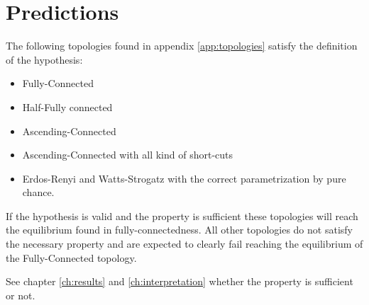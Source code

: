 \documentclass[Bachelorarbeit.tex]{subfiles}
\begin{document}
\section{Predictions}
The following topologies found in appendix \ref{app:topologies} satisfy the definition of the hypothesis:

\begin{itemize}
\item Fully-Connected
\item Half-Fully connected
\item Ascending-Connected
\item Ascending-Connected with all kind of short-cuts
\item Erdos-Renyi and Watts-Strogatz with the correct parametrization by pure chance.
\end{itemize}

If the hypothesis is valid and the property is sufficient these topologies will reach the equilibrium found in fully-connectedness. All other topologies do not satisfy the necessary property and are expected to clearly fail reaching the equilibrium of the Fully-Connected topology.

\medskip

See chapter \ref{ch:results} and \ref{ch:interpretation} whether the property is sufficient or not. 
\end{document}
